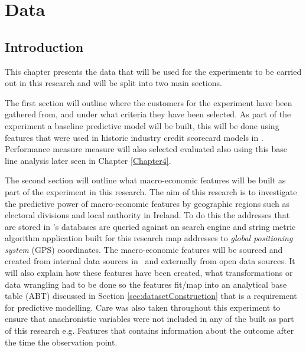 
\chapter{Data} %

\label{Chapter3} %


\section{Introduction}
This chapter presents the data that will be used for the experiments to be carried out in this research and will be split into two main sections. 

The first section will outline where the customers for the experiment have been gathered from, and under what criteria they have been selected. As part of the experiment a baseline predictive model will be built, this will be done using features that were used in historic industry credit scorecard models in \subjectname. Performance measure measure will also selected evaluated also using this base line analysis later seen in Chapter \ref{Chapter4}.

The second section will outline what macro-economic features will be built as part of the experiment in this research. The aim of this research is to investigate the predictive power of macro-economic features by geographic regions such as electoral divisions and local authority in Ireland. To do this the addresses that are stored in \subjectname's databases are queried against an search engine and string metric algorithm application built for this research map addresses to \textit{global positioning system} (GPS) coordinates. The macro-economic features will be sourced and created from internal data sources in \subjectname\ and externally from open data sources. It will also explain how these features have been created, what transformations or data wrangling had to be done so the features fit/map into an analytical base table (ABT) discussed in Section \ref{sec:datasetConstruction} that is a requirement for predictive modelling. Care was also taken throughout this experiment to ensure that anachronistic variables were not included in any of the  built as part of this research e.g. Features that contains information about the outcome after the time the observation point. 

